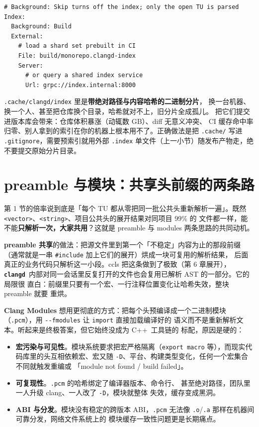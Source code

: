 \documentclass[12pt,a4paper,fontset=fandol]{ctexbook}
\newcommand{\Opt}[1]{\texttt{-\/-#1}}
\newcommand{\Bk}{\discretionary{}{}{}}
\newcommand{\Lib}[1]{\textbf{\texttt{#1}}}
\newcommand{\Lang}[1]{\textsf{#1}}
\newcommand{\CPP}{\Lang{C++}}
\newcommand{\CD}{\Lib{clangd}}
\begin{document}
\begin{lstlisting}[style=yamlstyle,caption={.clangd 里对索引范围与外部索引的配置},label={lst:ch03-clangd-yaml}]
# Background: Skip turns off the index; only the open TU is parsed
Index:
  Background: Build
  External:
    # load a shard set prebuilt in CI
    File: build/monorepo.clangd-index
    Server:
      # or query a shared index service
      Url: grpc://index.internal:8000
\end{lstlisting}

\begin{warning}[title={把 \texttt{.cache/clangd} 提交进版本库的后果}]
\texttt{.cache/clangd/index} 里是\textbf{带绝对路径与内容哈希的二进制分片}，
换一台机器、换一个人、甚至把仓库换个目录，哈希就对不上，旧分片全成孤儿。
把它们提交进版本库会带来：仓库体积暴涨（动辄数 GB）、diff 无意义冲突、
CI 缓存命中率归零、别人拿到的索引在你的机器上根本用不了。正确做法是把
\texttt{.cache/} 写进 \texttt{.gitignore}，需要预索引就用外部
\texttt{.index} 单文件（上一小节）随发布产物走，绝不要提交原始分片目录。
\end{warning}

\section{preamble 与模块：共享头前缀的两条路}
\label{sec:ch03-s4}

第 1 节的倍率说到底是「每个 TU 都从零把同一批公共头重新解析一遍」。既然
\texttt{<vector>}、\texttt{<string>}、项目公共头的展开结果对同项目 99\% 的
文件都一样，能不能\textbf{只解析一次，大家共用}？这就是 preamble 与 modules
两条思路的共同动机。

\textbf{preamble 共享}的做法：把源文件里到第一个「不稳定」内容为止的那段前缀
（通常就是一串 \texttt{\#include} 加上它们的展开）烘成一块可复用的解析结果，
后面真正的业务代码只解析这一小段。ccls 把这条做到了极致（第 6 章展开），
\CD\ 内部对同一会话里反复打开的文件也会复用已解析 AST 的一部分。它的局限很
直白：前缀里只要有一个宏、一行注释位置变化让哈希失效，整块 preamble 就要
重烘。

\textbf{Clang Modules} 想用更彻底的方式：把每个头预编译成一个二进制模块
（\texttt{.pcm}），用 \Opt{fmodules} 让 \texttt{import} 直接加载编译好的
语义而不是重新解析文本。听起来是终极答案，但它始终没成为 \CPP\ 工具链的
标配，原因是硬的：

\begin{itemize}
  \item \textbf{宏污染与可见性}。模块系统要求把宏严格隔离（\texttt{export
        macro} 等），而现实代码库里的头互相依赖宏、宏又随
        \texttt{-D}、平台、构建类型变化，任何一个宏集合不同就触发重编或
        「module not found / build failed」。
  \item \textbf{可复现性}。\texttt{.pcm} 的哈希绑定了编译器版本、命令行、
        甚至绝对路径，团队里一人升级 clang、一人改了 \texttt{-D}，模块就整体
        失效，缓存变成黑洞。
  \item \textbf{ABI 与分发}。模块没有稳定的跨版本 ABI，\texttt{.pcm}
        无法像 \texttt{.o}/{\Bk}\texttt{.a} 那样在机器间可靠分发，网络文件系统上的
        模块缓存一致性问题更是长期痛点。
\end{itemize}
\end{document}
